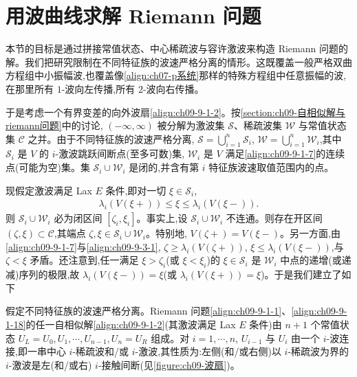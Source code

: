 \documentclass[../../main.tex]{subfiles}
\begin{document}
\section{用波曲线求解 Riemann 问题}\label{section:ch09-用波曲线求解riemann问题}

本节的目标是通过拼接常值状态、中心稀疏波与容许激波来构造 Riemann 问题的解。我们把研究限制在不同特征族的波速严格分离的情形。这既覆盖一般严格双曲方程组中小振幅波,也覆盖像\eqref{align:ch07-p系统}那样的特殊方程组中任意振幅的波,在那里所有 $1$-波向左传播,所有 $2$-波向右传播。

于是考虑一个有界变差的向外波扇\eqref{align:ch09-9-1-2}。按\cref{section:ch09-自相似解与riemann问题}中的讨论, $(-\infty,\infty)$ 被分解为激波集 $\mathscr{S}$、稀疏波集 $\mathscr{W}$ 与常值状态集 $\mathscr{C}$ 之并。由于不同特征族的波速严格分离, $\mathscr{S}=\bigcup_{i=1}^{n}\mathscr{S}_{i}$, $\mathscr{W}=\bigcup_{i=1}^{n}\mathscr{W}_{i}$,其中 $\mathscr{S}_{i}$ 是 $V$ 的 $i$-激波跳跃间断点(至多可数)集, $\mathscr{W}_{i}$ 是 $V$ 满足\eqref{align:ch09-9-1-7}的连续点(可能为空)集。集 $\mathscr{S}_{i}\cup\mathscr{W}_{i}$ 是闭的,并含有第 $i$ 特征族波速取值范围内的点。

现假定激波满足 Lax $E$ 条件,即对一切 $\xi\in\mathscr{S}_{i}$,
\begin{align}
\lambda_{i}(V(\xi+))\leqslant\xi\leqslant\lambda_{i}(V(\xi-)).
\label{align:ch09-9-3-1}
\end{align}
则 $\mathscr{S}_{i}\cup\mathscr{W}_{i}$ 必为闭区间 $[\zeta_{i},\xi_{i}]$。事实上,设 $\mathscr{S}_{i}\cup\mathscr{W}_{i}$ 不连通。则存在开区间 $(\zeta,\xi)\subset\mathscr{C}$,其端点 $\zeta,\xi\in\mathscr{S}_{i}\cup\mathscr{W}_{i}$。特别地, $V(\zeta+)=V(\xi-)$。另一方面,由\eqref{align:ch09-9-1-7}与\eqref{align:ch09-9-3-1}, $\zeta\geqslant\lambda_{i}(V(\zeta+))$, $\xi\leqslant\lambda_{i}(V(\xi-))$,与 $\zeta<\xi$ 矛盾。还注意到,任一满足 $\xi>\zeta_{i}$(或 $\xi<\xi_{i}$)的 $\xi\in\mathscr{S}_{i}$ 是 $\mathscr{W}_{i}$ 中点的递增(或递减)序列的极限,故 $\lambda_{i}(V(\xi-))=\xi$(或 $\lambda_{i}(V(\xi+))=\xi$)。于是我们建立了如下

\begin{theorem}\label{theorem:ch09-波扇结构}
假定不同特征族的波速严格分离。Riemann 问题\eqref{align:ch09-9-1-1}、\eqref{align:ch09-9-1-18}的任一自相似解\eqref{align:ch09-9-1-2}(其激波满足 Lax $E$ 条件)由 $n+1$ 个常值状态 $U_{L}=U_{0},U_{1},\cdots ,U_{n-1},U_{n}=U_{R}$ 组成。对 $i=1,\cdots ,n$, $U_{i-1}$ 与 $U_{i}$ 由一个 $i$-波连接,即一串中心 $i$-稀疏波和/或 $i$-激波,其性质为:左侧(和/或右侧)以 $i$-稀疏波为界的 $i$-激波是左(和/或右) $i$-接触间断(见\cref{figure:ch09-波扇})。
\end{theorem}
\end{document}
